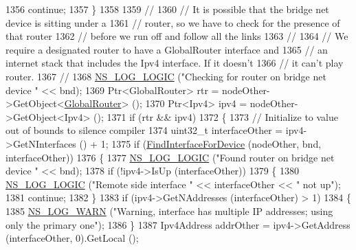 \begin{DoxyCode}
1356               \textcolor{keywordflow}{continue};
1357             \}
1358 
1359           \textcolor{comment}{//}
1360           \textcolor{comment}{// It is possible that the bridge net device is sitting under a}
1361           \textcolor{comment}{// router, so we have to check for the presence of that router}
1362           \textcolor{comment}{// before we run off and follow all the links}
1363           \textcolor{comment}{//}
1364           \textcolor{comment}{// We require a designated router to have a GlobalRouter interface and}
1365           \textcolor{comment}{// an internet stack that includes the Ipv4 interface.  If it doesn't}
1366           \textcolor{comment}{// it can't play router.}
1367           \textcolor{comment}{//}
1368           \hyperlink{group__logging_ga88acd260151caf2db9c0fc84997f45ce}{NS\_LOG\_LOGIC} (\textcolor{stringliteral}{"Checking for router on bridge net device "} << bnd);
1369           Ptr<GlobalRouter> rtr = nodeOther->GetObject<\hyperlink{classns3_1_1GlobalRouter_a778050c70fe491c0fe62b7cf6b10aaf6}{GlobalRouter}> ();
1370           Ptr<Ipv4> ipv4 = nodeOther->GetObject<Ipv4> ();
1371           \textcolor{keywordflow}{if} (rtr && ipv4)
1372             \{
1373               \textcolor{comment}{// Initialize to value out of bounds to silence compiler}
1374               uint32\_t interfaceOther = ipv4->GetNInterfaces () + 1;
1375               \textcolor{keywordflow}{if} (\hyperlink{classns3_1_1GlobalRouter_a7b30c3c09f93e3f3ac7cfe787b51d127}{FindInterfaceForDevice} (nodeOther, bnd, interfaceOther))
1376                 \{
1377                   \hyperlink{group__logging_ga88acd260151caf2db9c0fc84997f45ce}{NS\_LOG\_LOGIC} (\textcolor{stringliteral}{"Found router on bridge net device "} << bnd);
1378                   \textcolor{keywordflow}{if} (!ipv4->IsUp (interfaceOther))
1379                     \{
1380                       \hyperlink{group__logging_ga88acd260151caf2db9c0fc84997f45ce}{NS\_LOG\_LOGIC} (\textcolor{stringliteral}{"Remote side interface "} << interfaceOther << \textcolor{stringliteral}{" not up"});
1381                       \textcolor{keywordflow}{continue};
1382                     \}
1383                   \textcolor{keywordflow}{if} (ipv4->GetNAddresses (interfaceOther) > 1)
1384                     \{
1385                       \hyperlink{group__logging_gade7208b4009cdf0e25783cd26766f559}{NS\_LOG\_WARN} (\textcolor{stringliteral}{"Warning, interface has multiple IP addresses; using only the
       primary one"});
1386                     \}
1387                   Ipv4Address addrOther = ipv4->GetAddress (interfaceOther, 0).GetLocal ();

\end{DoxyCode}

